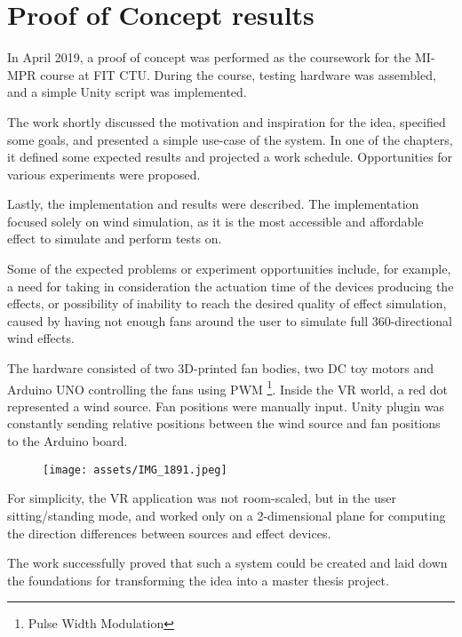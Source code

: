 \chapter{Proof of Concept results}

In April 2019, a proof of concept was performed as the coursework for the MI-MPR
course at FIT CTU\hyperlink{poc}{}. During the course, testing hardware was assembled,
and a simple Unity script was implemented.


The work shortly discussed the motivation and inspiration for the idea,
specified some goals, and presented a simple use-case of the system. In one of the
chapters, it defined some expected results and projected a work schedule.
Opportunities for various experiments were proposed.


Lastly, the implementation and results were described. The implementation
focused solely on wind simulation, as it is the most accessible and affordable
effect to simulate and perform tests on.


Some of the expected problems or experiment opportunities include, for example,
a need for taking in consideration the actuation time of the devices producing
the effects, or possibility of inability to reach the desired quality of effect
simulation, caused by having not enough fans around the user to simulate
full 360-directional wind effects.


The hardware consisted of two 3D-printed fan bodies, two DC toy motors and Arduino
UNO controlling the fans using PWM \footnote{Pulse Width Modulation}. Inside
the VR world, a red dot represented a wind source. Fan positions were manually
input. Unity plugin was constantly sending relative positions between the
wind source and fan positions to the Arduino board.


\begin{figure}[h]{}
\centering\texttt{[image: assets/IMG\_1891.jpeg]}
\caption{}

\end{figure}

For simplicity, the VR application was not room-scaled, but in the
user sitting/standing mode, and worked only on a 2-dimensional plane for
computing the direction differences between sources and effect devices.


The work successfully proved that such a system could be created and laid down
the foundations for transforming the idea into a master thesis project.

